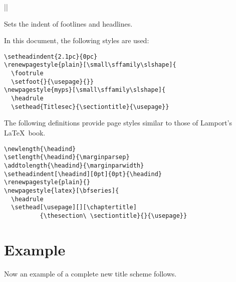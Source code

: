 \documentclass{ltxguide}
\begin{document}
\begin{decl}
||
\end{decl}

Sets the indent of footlines and headlines.

In this document, the following styles are used:
\begin{verbatim}
\setheadindent{2.1pc}{0pc}
\renewpagestyle{plain}[\small\sffamily\slshape]{
  \footrule 
  \setfoot{}{\usepage}{}}
\newpagestyle{myps}[\small\sffamily\slshape]{
  \headrule
  \sethead{Titlesec}{\sectiontitle}{\usepage}}
\end{verbatim}

The following definitions provide page styles similar to
those of Lamport's \LaTeX\ book.

\begin{verbatim}
\newlength{\headind}
\setlength{\headind}{\marginparsep}
\addtolength{\headind}{\marginparwidth}
\setheadindent[\headind][0pt]{0pt}{\headind}
\renewpagestyle{plain}{}
\newpagestyle{latex}[\bfseries]{
  \headrule
  \sethead[\usepage][][\chaptertitle]
          {\thesection\ \sectiontitle}{}{\usepage}}
\end{verbatim}

\section{Example}

Now an example of a complete new title scheme follows.
\end{document}
